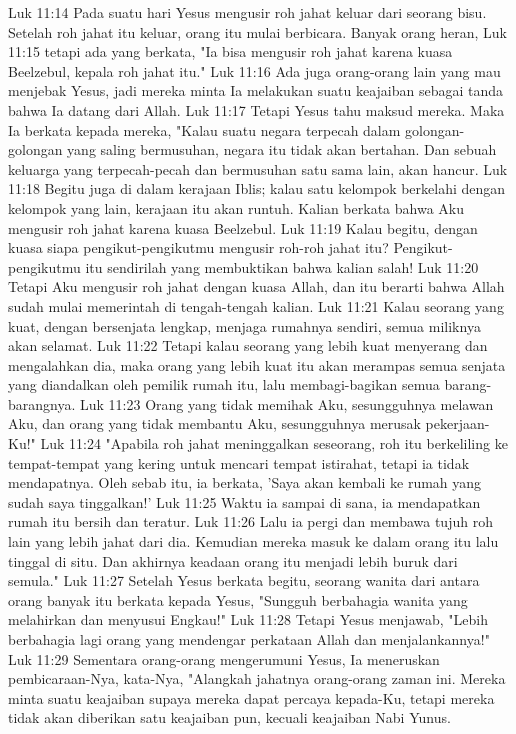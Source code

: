 Luk 11:14  Pada suatu hari Yesus mengusir roh jahat keluar dari seorang bisu. Setelah roh jahat itu keluar, orang itu mulai berbicara. Banyak orang heran,
Luk 11:15  tetapi ada yang berkata, "Ia bisa mengusir roh jahat karena kuasa Beelzebul, kepala roh jahat itu."
Luk 11:16  Ada juga orang-orang lain yang mau menjebak Yesus, jadi mereka minta Ia melakukan suatu keajaiban sebagai tanda bahwa Ia datang dari Allah.
Luk 11:17  Tetapi Yesus tahu maksud mereka. Maka Ia berkata kepada mereka, "Kalau suatu negara terpecah dalam golongan-golongan yang saling bermusuhan, negara itu tidak akan bertahan. Dan sebuah keluarga yang terpecah-pecah dan bermusuhan satu sama lain, akan hancur.
Luk 11:18  Begitu juga di dalam kerajaan Iblis; kalau satu kelompok berkelahi dengan kelompok yang lain, kerajaan itu akan runtuh. Kalian berkata bahwa Aku mengusir roh jahat karena kuasa Beelzebul.
Luk 11:19  Kalau begitu, dengan kuasa siapa pengikut-pengikutmu mengusir roh-roh jahat itu? Pengikut-pengikutmu itu sendirilah yang membuktikan bahwa kalian salah!
Luk 11:20  Tetapi Aku mengusir roh jahat dengan kuasa Allah, dan itu berarti bahwa Allah sudah mulai memerintah di tengah-tengah kalian.
Luk 11:21  Kalau seorang yang kuat, dengan bersenjata lengkap, menjaga rumahnya sendiri, semua miliknya akan selamat.
Luk 11:22  Tetapi kalau seorang yang lebih kuat menyerang dan mengalahkan dia, maka orang yang lebih kuat itu akan merampas semua senjata yang diandalkan oleh pemilik rumah itu, lalu membagi-bagikan semua barang-barangnya.
Luk 11:23  Orang yang tidak memihak Aku, sesungguhnya melawan Aku, dan orang yang tidak membantu Aku, sesungguhnya merusak pekerjaan-Ku!"
Luk 11:24  "Apabila roh jahat meninggalkan seseorang, roh itu berkeliling ke tempat-tempat yang kering untuk mencari tempat istirahat, tetapi ia tidak mendapatnya. Oleh sebab itu, ia berkata, 'Saya akan kembali ke rumah yang sudah saya tinggalkan!'
Luk 11:25  Waktu ia sampai di sana, ia mendapatkan rumah itu bersih dan teratur.
Luk 11:26  Lalu ia pergi dan membawa tujuh roh lain yang lebih jahat dari dia. Kemudian mereka masuk ke dalam orang itu lalu tinggal di situ. Dan akhirnya keadaan orang itu menjadi lebih buruk dari semula."
Luk 11:27  Setelah Yesus berkata begitu, seorang wanita dari antara orang banyak itu berkata kepada Yesus, "Sungguh berbahagia wanita yang melahirkan dan menyusui Engkau!"
Luk 11:28  Tetapi Yesus menjawab, "Lebih berbahagia lagi orang yang mendengar perkataan Allah dan menjalankannya!"
Luk 11:29  Sementara orang-orang mengerumuni Yesus, Ia meneruskan pembicaraan-Nya, kata-Nya, "Alangkah jahatnya orang-orang zaman ini. Mereka minta suatu keajaiban supaya mereka dapat percaya kepada-Ku, tetapi mereka tidak akan diberikan satu keajaiban pun, kecuali keajaiban Nabi Yunus.
